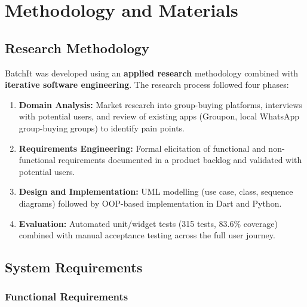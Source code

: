 \documentclass[12pt, a4paper]{report}
\begin{document}
\chapter{Methodology and Materials}

\section{Research Methodology}

BatchIt was developed using an \textbf{applied research} methodology combined with \textbf{iterative software engineering}. The research process followed four phases:

\begin{enumerate}[leftmargin=*, label=\textcolor{batchitGreen}{\textbf{\arabic*.}}]
  \item \textbf{Domain Analysis:} Market research into group-buying platforms, interviews with potential users, and review of existing apps (Groupon, local WhatsApp group-buying groups) to identify pain points.
  \item \textbf{Requirements Engineering:} Formal elicitation of functional and non-functional requirements documented in a product backlog and validated with potential users.
  \item \textbf{Design and Implementation:} UML modelling (use case, class, sequence diagrams) followed by OOP-based implementation in Dart and Python.
  \item \textbf{Evaluation:} Automated unit/widget tests (315 tests, 83.6\% coverage) combined with manual acceptance testing across the full user journey.
\end{enumerate}

\newpage
\section{System Requirements}

\subsection{Functional Requirements}
\end{document}
